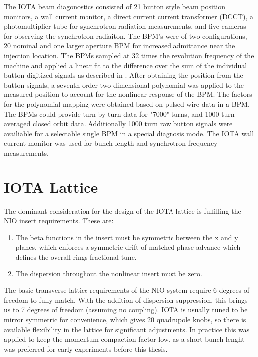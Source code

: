 The IOTA beam diagonostics consisted of 21 button style beam position monitors, a wall current monitor, a direct current current transformer (DCCT), a photomultiplier tube for synchrotron radiation measurements, and five cameras for observing the synchrotron radiaiton. The BPM's were of two configurations, 20 nominal and one larger aperture BPM for increased admittance near the injection location. The BPMs sampled at 32 times the revolution frequency of the machine and applied a linear fit to the difference over the sum of the individual button digitized signals as described in \cite{linearBPM}. After obtaining the position from the button signals, a seventh order two dimensional polynomial was applied to the measured position to account for the nonlinear response of the BPM. The factors for the polynomial mapping were obtained based on pulsed wire data in a BPM. The BPMs could provide turn by turn data for "7000" turns, and 1000 turn averaged closed orbit data. Additionally 1000 turn raw button signals were availiable for a selectable single BPM in a special diagnosis mode. The IOTA wall current monitor was used for bunch length and synchrotron frequency measurements. 

\section{IOTA Lattice}
The dominant consideration for the design of the IOTA lattice is fulfilling the NIO insert requirements. These are:

\begin{enumerate}
	\item The beta functions in the insert must be symmetric between the x and y planes, which enforces a symmetric drift of matched phase advance which defines the overall rings fractional tune.
	\item The dispersion throughout the nonlinear insert must be zero.
\end{enumerate}

The basic transverse lattice requirements of the NIO system require 6 degrees of freedom to fully match. With the addition of dispersion suppression, this brings us to 7 degrees of freedom (assuming no coupling). IOTA is usually tuned to be mirror symmetric for convenience, which gives 20 quadrupole knobs, so there is available flexibility in the lattice for significant adjustments. In practice this was applied to keep the momentum compaction factor low, as a short bunch lenght was preferred for early experiments before this thesis.

